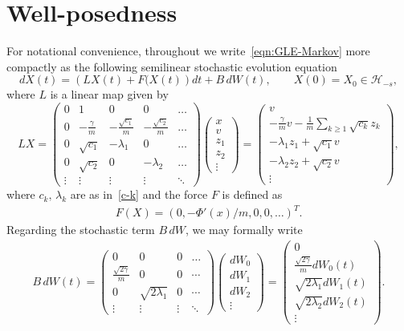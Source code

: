 \documentclass[11pt]{amsart}
\theoremstyle{definition}
\renewcommand{\H}{\mathcal{H}}
\newcommand{\dW}{\text{d}W}
\theoremstyle{definition}
\theoremstyle{plain}
\numberwithin{equation}{section}
\begin{document}
\section{Well-posedness}\label{sec:sol'n}\label{sec:well-posed}
For notational convenience, throughout we write~\eqref{eqn:GLE-Markov} more compactly as the following semilinear stochastic evolution equation
\begin{equation} \label{eqn:infinite-mode-short}
d X(t) = \left(LX(t)+F(X(t)\right)d t+B \, d W(t),\qquad X(0)=X_0\in\H_{-s},
\end{equation}
where $L$ is a linear map given by
\begin{equation} \label{eqn:generator}
LX = \begin{pmatrix}
0 & 1 & 0 & 0  & \dots\\
0 & -\frac{\gamma}{m} & -\frac{\sqrt{c_1}}{m} &  -\frac{\sqrt{c_2}}{m} & \dots\\
0&\sqrt{c_1} &-\lambda_1 &0  & \dots\\
0&\sqrt{c_2} & 0  & -\lambda_2  &\dots\\
\vdots & \vdots &\vdots &\vdots &\ddots 
\end{pmatrix}\begin{pmatrix}
x\\v\\z_1\\z_2\\ \vdots
\end{pmatrix}=\begin{pmatrix}
v \\ -\frac{\gamma}{m} v-\frac{1}{m}\sum_{k\geq 1} \sqrt{c_k} z_k\\
-\lambda_1 z_1+ \sqrt{c_1}v\\
-\lambda_2 z_2+ \sqrt{c_2}v\\
\vdots
\end{pmatrix},
\end{equation}
where $c_k,\,\lambda_k$ are as in~\eqref{c-k} and the force $F$ is defined as
\begin{align*}
F(X)=(0, -\Phi'(x)/m,0,0, \dots)^T.
\end{align*}
Regarding the stochastic term $B\, dW$, we may formally write
\begin{align*}
 B\, dW(t)=\begin{pmatrix}
 0& 0&0 &\dots\\
 \frac{\sqrt{2\gamma}}{m}&0&0&\cdots\\
 0&\sqrt{2\lambda_1}&0&\cdots\\
 \vdots&\vdots&\vdots&\ddots
 \end{pmatrix}\begin{pmatrix}
 dW_0\\dW_1\\dW_2\\ \vdots
 \end{pmatrix}=\begin{pmatrix}
0\\ \frac{\sqrt{2\gamma}}{m}dW_0(t) \\
\sqrt{2\lambda_1}dW_1(t)\\ \sqrt{2\lambda_2}dW_2(t) \\ \vdots
\end{pmatrix}.
\end{align*}
\end{document}
